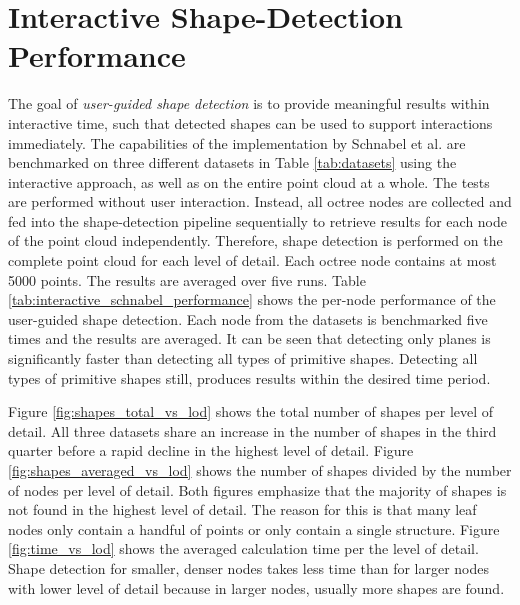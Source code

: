 \section{Interactive Shape-Detection Performance}
\label{sec:shape_detection_performance}

The goal of \textit{user-guided shape detection} is to provide meaningful results within interactive time, such that detected shapes can be used to support interactions immediately. The capabilities of the implementation by Schnabel et al. \cite{schnabel-2007-software} are benchmarked on three different datasets in Table \ref{tab:datasets} using the interactive approach, as well as on the entire point cloud at a whole. The tests are performed without user interaction. Instead, all octree nodes are collected and fed into the shape-detection pipeline sequentially to retrieve results for each node of the point cloud independently. Therefore, shape detection is performed on the complete point cloud for each level of detail. Each octree node contains at most 5000 points. The results are averaged over five runs. Table \ref{tab:interactive_schnabel_performance} shows the per-node performance of the user-guided shape detection. Each node from the datasets is benchmarked five times and the results are averaged. It can be seen that detecting only planes is significantly faster than detecting all types of primitive shapes. Detecting all types of primitive shapes still, produces results within the desired time period. 



\par

Figure \ref{fig:shapes_total_vs_lod} shows the total number of shapes per level of detail. All three datasets share an increase in the number of shapes in the third quarter before a rapid decline in the highest level of detail. 
Figure \ref{fig:shapes_averaged_vs_lod} shows the number of shapes divided by the number of nodes per level of detail. Both figures emphasize that the majority of shapes is not found in the highest level of detail. The reason for this is that many leaf nodes only contain a handful of points or only contain a single structure. 
Figure \ref{fig:time_vs_lod} shows the averaged calculation time per the level of detail. Shape detection for smaller, denser nodes takes less time than for larger nodes with lower level of detail because in larger nodes, usually more shapes are found. 

